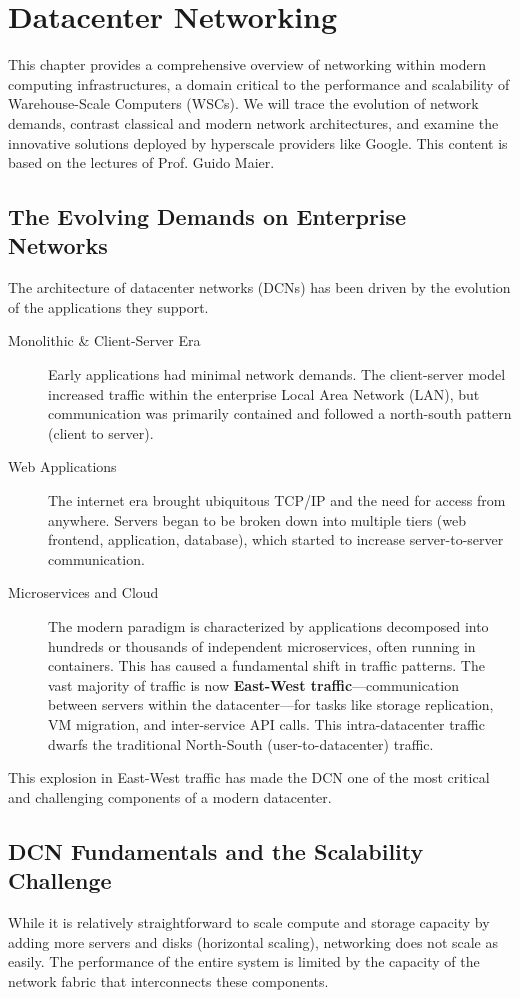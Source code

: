 \chapter{Datacenter Networking}
\label{chap:networking}

This chapter provides a comprehensive overview of networking within modern computing infrastructures, a domain critical to the performance and scalability of Warehouse-Scale Computers (WSCs). We will trace the evolution of network demands, contrast classical and modern network architectures, and examine the innovative solutions deployed by hyperscale providers like Google. This content is based on the lectures of Prof. Guido Maier.

\section{The Evolving Demands on Enterprise Networks}
The architecture of datacenter networks (DCNs) has been driven by the evolution of the applications they support.
\begin{description}
    \item[Monolithic \& Client-Server Era] Early applications had minimal network demands. The client-server model increased traffic within the enterprise Local Area Network (LAN), but communication was primarily contained and followed a north-south pattern (client to server).
    \item[Web Applications] The internet era brought ubiquitous TCP/IP and the need for access from anywhere. Servers began to be broken down into multiple tiers (web frontend, application, database), which started to increase server-to-server communication.
    \item[Microservices and Cloud] The modern paradigm is characterized by applications decomposed into hundreds or thousands of independent microservices, often running in containers. This has caused a fundamental shift in traffic patterns. The vast majority of traffic is now \textbf{East-West traffic}—communication between servers within the datacenter—for tasks like storage replication, VM migration, and inter-service API calls. This intra-datacenter traffic dwarfs the traditional North-South (user-to-datacenter) traffic.
\end{description}
This explosion in East-West traffic has made the DCN one of the most critical and challenging components of a modern datacenter.

\section{DCN Fundamentals and the Scalability Challenge}
While it is relatively straightforward to scale compute and storage capacity by adding more servers and disks (horizontal scaling), networking does not scale as easily. The performance of the entire system is limited by the capacity of the network fabric that interconnects these components.

